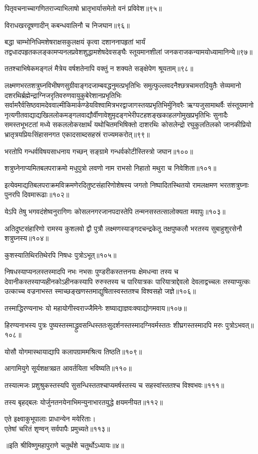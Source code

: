 \begin{flushleft}
पितृवचनाच्चागणितराज्याभिलाषो भ्रातृभार्यासमेतो वनं प्रविवेश॥९५॥

विराधखरदूषणादीन् कबन्धवालिनौ च निजघान॥९६॥

बद्धा चाम्भोनिधिमशेषराक्षसकुलक्षयं कृत्वा दशाननापहृतां भार्यं तद्वधादपहृतकलङ्कामप्यनलप्रवेशशुद्धामशेषदेवसङ्घैः स्तूयमानशीलां जनकराजकन्यामयोध्यामानिन्ये॥९७॥

ततश्चाभिषेकमङ्गलं मैत्रेय वर्षशतेनापि वक्तुं न शक्यते सङ्क्षेपेण श्रूयताम्॥९८॥

लक्ष्मणभरतशत्रुघ्नविभीषणसुग्रीवाङ्गदजाम्बवद्धनुमत्प्रभृतिभिः समुत्फुल्लवदनैश्छत्रचामरादियुतैः सेव्यमानो दशरथिर्ब्रह्मेन्द्राग्निजरृतिवरुणवायुकुबेरेशानप्रभृतिभिः सर्वामरैर्वसिष्ठ\-वामदेव\-वाल्मीकि\-मार्कण्डेय\-विश्वामित्र\-भरद्वाजागस्तय\-प्रभृतिभिर्मुनिवरैः ऋग्यजुसामाथर्वैः संस्तूयमानो नृत्यगीतवाद्याद्यखिललोकमङ्गलवाद्यौर्वीणावेशुमृदङ्गभेरी\-पटह\-शङ्ख\-काहल\-गोमुख\-प्रभृतिभिः सुनादैः समस्तभूभटतां मध्ये सकललोकरक्षार्थं यथोचितमभिषिक्तो दाशरथिः कोसलेन्द्रो रघुकुलतिलको जानकीप्रियो भ्रातृत्रयप्रियःसिंहासनगत एकादसाब्दसहस्रं राज्यमकरोत्॥९९॥

भरतोपि गन्धर्वविषयसाधनाय गच्छन् सङ्ग्रामे गन्धर्वकोटीस्तिस्त्रो जघान॥१००॥

शत्रुघ्नेनाप्यमितबलपराक्रमो मधुपुत्रो लवणो नाम राभसो निहातो मथुरा च निवेशिता॥१०१॥

इत्येवमाद्यतिबलपराक्रमविक्रमणेरदितुष्टसंहारिणोशेषस्य जगतो निष्पादितस्थितयो रामलक्षमण भरतशत्रुघ्नाः पुनरपि दिवमारूढाः॥१०२॥

येऽपि तेषु भगवदंशेष्वनुरागिणः कोसलनगरजानपदास्तेपि तन्मनसस्तत्सालोक्यता मवापुः॥१०३॥

अतिदुष्टसंहारिणो रामस्य कुशलवो द्वौ पुत्रौ लक्ष्मणस्याङ्गदचन्द्रकेतू तक्षपुष्कलौ भरतस्य सुबाहुशुरसेनौ शत्रुघ्नस्य॥१०४॥

कुशस्यातिथिरतिथेरपि निषधः पुत्रोऽभूत्॥१०५॥

निषधस्याप्यनलस्तस्मादपि नभः नभसः पुण्डरीकस्तत्तनयः क्षेमधन्वा तस्य च देवानीकस्तस्याप्यहीनकोऽहीनकस्यापि रुरुस्तस्य च पारियात्रकः पारियात्राद्देवलो देवलाद्वच्चलः तस्याप्युत्कः उत्काच्च वज्रनाभस्त स्माच्छङ्खणस्तमाद्युषितास्वस्ततश्च विश्वसहो जज्ञे॥१०६॥

तस्माद्धिरण्यनाभः यो महायोगीस्वराज्जैमिनेः शष्याद्याज्ञवःक्याद्योगमवाय॥१०७॥

हिरण्यनाभस्य पुत्रः पुष्यस्तस्माद्ध्रुवसन्धिस्ततःसुदर्शनस्तस्मादग्निवर्मस्ततः शीघ्रगस्तस्मादपि मरुः पुत्रोऽभवत्॥१०८॥

योसौ योगमास्थायाद्यापि कलापग्राममश्रित्य तिष्ठति॥१०९॥

आगामियुगे सूर्यशक्षत्रव्रत आवर्तयिता भविष्यति॥११०॥

तस्यात्मजः प्रशुश्रुकस्तस्यपि सुसन्धिस्ततश्चाप्यमर्षस्तस्य च सहस्वांस्ततश्च विश्वभवः॥१११॥

तस्य बृहद्बलः योर्जुनतनयेनाभिमन्युनाभारतयुद्धे क्षयमनीयत॥११२॥

एते इक्ष्वाकुभूपालाः प्राधान्येन मयेरिताः।\\
एतेषां चरितं शृण्वन् सर्वपापैः प्रमुच्यते॥११३॥

\end{flushleft}

॥इति श्रीविष्णुमहापुराणे चतुर्थंशे चतुर्थोऽध्यायः॥४॥
